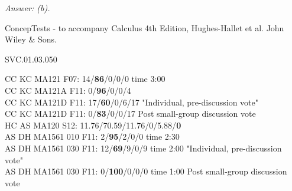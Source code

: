 {\it Answer: (b).} 


\medskip
ConcepTests - to accompany Calculus 4th Edition, Hughes-Hallet et al. John Wiley \& Sons.

SVC.01.03.050


CC KC MA121 F07: 14/{\bf 86}/0/0/0 time 3:00 \\
CC KC MA121A F11: 0/{\bf96}/0/0/4  \\
CC KC MA121D F11: 17/{\bf60}/0/6/17 "Individual, pre-discussion vote" \\
CC KC MA121D F11: 0/{\bf83}/0/0/17 Post small-group discussion vote \\
HC AS MA120 S12: 11.76/70.59/11.76/0/5.88/{\bf0}  \\
AS DH MA1561 010 F11: 2/{\bf95}/2/0/0 time 2:30  \\
AS DH MA1561 030 F11: 12/{\bf69}/9/0/9 time 2:00 "Individual, pre-discussion vote" \\
AS DH MA1561 030 F11: 0/{\bf100}/0/0/0 time 1:00 Post small-group discussion vote \\
